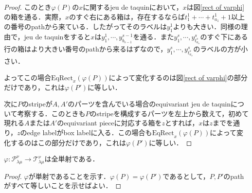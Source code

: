 \begin{proof}
  

  このとき$\varphi(P)$の$x$に関するjeu de taquinにおいて，$x$は図\ref{rect of varphi}の箱を通る．実際，$x$のすぐ右にある箱は，存在するならば$t^1_1+\cdots+t^1_{a_1}+1$以上の番号のpathから来ている．したがってそのラベルは$y^1_1$よりも大きい．同様の理由で，jeu de taquinをすると$x$は$y^1_1,\cdots,y^{s-1}_{b_{s-1}}$を通る．また$y^s_1,\cdots,y^s_{t^s_{a_s}}$のすぐ下にある行の箱はより大きい番号のpathから来るはずなので，$y^s_1,\cdots,y^s_{t^s_{a_s}}$のラベルの方が小さい．

  よってこの場合$\text{EqRect}_x(\varphi(P))$によって変化するのは図\ref{rect of varphi}の部分だけであり，これは$\varphi(P')$に等しい．

  次に$P$のstripeが$A,A'$のパーツを含んでいる場合のequivariant jeu de taquinについて考察する．このときも$P$のstripeを構成するパーツを左上から数えて，初めて現れる$A$または$A'$のequivariant pieceに対応する箱を$z$とすれば，$x$は$z$までを通り，$z$のedge labelがbox labelに入る．この場合も$\text{EqRect}_x(\varphi(P))$によって変化するのはこの部分だけであり，これは$\varphi(P')$に等しい．
\end{proof}

\begin{prop}
  $\varphi\colon\mathcal{P}^\nu_{\lambda\mu}\rightarrow\mathcal{T}^\nu_{\lambda\mu}$は全単射である．
\end{prop}

\begin{proof}
  $\varphi$が単射であることを示す．$\varphi(P)=\varphi(P')$であるとして，$P,P'$のpathがすべて等しいことを示せばよい．
\end{proof}

